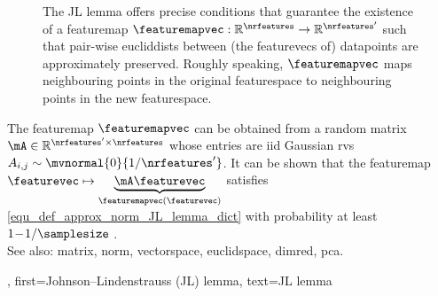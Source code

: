{{\begin{figure}[hbtp]
		\caption{The JL lemma offers precise conditions that guarantee the existence of 
		         a \gls{featuremap} $\featuremapvec: \mathbb{R}^{\nrfeatures} \rightarrow \mathbb{R}^{\nrfeatures'}$ such that pair-wise \glspl{eucliddist} between (the \glspl{featurevec} of) \glspl{datapoint} are 
			approximately preserved. Roughly speaking, 
			$\featuremapvec$ maps neighbouring points in the original \gls{featurespace} 
			to neighbouring points in the new \gls{featurespace}.}
	\end{figure}
	The \gls{featuremap} $\featuremapvec$ can be obtained from a random \gls{matrix} 
	$\mA \in \mathbb{R}^{\nrfeatures' \times \nrfeatures}$ whose entries are \gls{iid} 
	Gaussian \glspl{rv} $A_{i,j} \sim \mvnormal{0}{1/\nrfeatures'}$. 
	It can be shown that the \gls{featuremap} $\featurevec \mapsto \underbrace{\mA \featurevec}_{\featuremapvec(\featurevec)}$ 
	satisfies \eqref{equ_def_approx_norm_JL_lemma_dict} with \gls{probability} at least $1\!-\!1/\samplesize$ \cite{ProofJLlemma}. \\
  See also: \gls{matrix}, \gls{norm}, \gls{vectorspace}, \gls{euclidspace}, \gls{dimred}, \gls{pca}.},
  first={Johnson--Lindenstrauss (JL) lemma},
  text={JL lemma}
}

